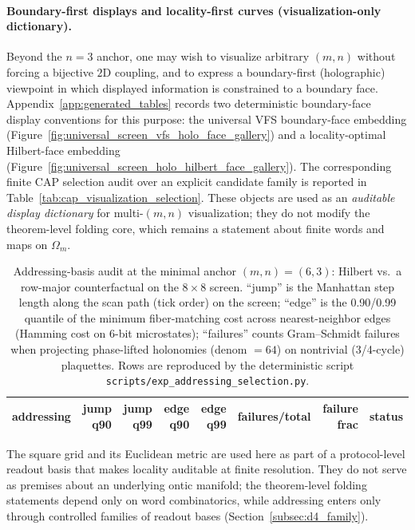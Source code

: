 \paragraph{Boundary-first displays and locality-first curves (visualization-only dictionary).}
\InterfaceTag Beyond the $n=3$ anchor, one may wish to visualize arbitrary $(m,n)$ without forcing a bijective $2$D coupling, and to express a boundary-first (holographic) viewpoint in which displayed information is constrained to a boundary face.
Appendix~\ref{app:generated_tables} records two deterministic boundary-face display conventions for this purpose:
the universal VFS boundary-face embedding (Figure~\ref{fig:universal_screen_vfs_holo_face_gallery}) and a locality-optimal Hilbert-face embedding (Figure~\ref{fig:universal_screen_holo_hilbert_face_gallery}).
The corresponding finite CAP selection audit over an explicit candidate family is reported in Table~\ref{tab:cap_visualization_selection}.
These objects are used as an \emph{auditable display dictionary} for multi-$(m,n)$ visualization; they do not modify the theorem-level folding core, which remains a statement about finite words and maps on $\Omega_m$.

\begin{table}[t]
\centering
\scriptsize
\setlength{\tabcolsep}{6pt}
\renewcommand{\arraystretch}{1.15}
\begin{tabular}{lrrrrrrl}
\toprule
addressing & jump q90 & jump q99 & edge q90 & edge q99 & failures/total & failure frac & status \\
\midrule
%
\end{tabular}
\caption{Addressing-basis audit at the minimal anchor $(m,n)=(6,3)$: Hilbert vs.\ a row-major counterfactual on the $8\times 8$ screen. ``jump'' is the Manhattan step length along the scan path (tick order) on the screen; ``edge'' is the 0.90/0.99 quantile of the minimum fiber-matching cost across nearest-neighbor edges (Hamming cost on $6$-bit microstates); ``failures'' counts Gram--Schmidt failures when projecting phase-lifted holonomies (denom $=64$) on nontrivial (3/4-cycle) plaquettes. Rows are reproduced by the deterministic script \texttt{scripts/exp\_addressing\_selection.py}.}
\label{tab:addressing_selection}
\end{table}

\begin{remark}\label{rem:addressing_not_ontic_dimension}
The square grid and its Euclidean metric are used here as part of a protocol-level readout basis that makes locality auditable at finite resolution.
They do not serve as premises about an underlying ontic manifold; the theorem-level folding statements depend only on word combinatorics, while addressing enters only through controlled families of readout bases (Section~\ref{subsec:d4_family}).
\end{remark}

